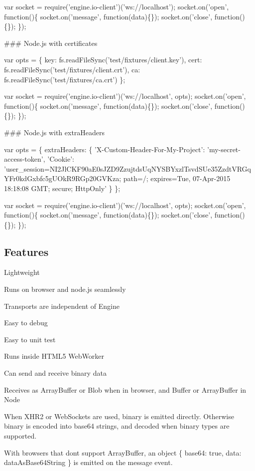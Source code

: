 \begin{DoxyCode}
var socket = require('engine.io-client')('ws://localhost');
socket.on('open', function()\{
  socket.on('message', function(data)\{\});
  socket.on('close', function()\{\});
\});
\end{DoxyCode}


\#\#\# Node.\+js with certificates 
\begin{DoxyCode}
var opts = \{
  key: fs.readFileSync('test/fixtures/client.key'),
  cert: fs.readFileSync('test/fixtures/client.crt'),
  ca: fs.readFileSync('test/fixtures/ca.crt')
\};

var socket = require('engine.io-client')('ws://localhost', opts);
socket.on('open', function()\{
  socket.on('message', function(data)\{\});
  socket.on('close', function()\{\});
\});
\end{DoxyCode}


\#\#\# Node.\+js with extra\+Headers 
\begin{DoxyCode}
var opts = \{
  extraHeaders: \{
    'X-Custom-Header-For-My-Project': 'my-secret-access-token',
    'Cookie':
       'user\_session=NI2JlCKF90aE0sJZD9ZzujtdsUqNYSBYxzlTsvdSUe35ZzdtVRGqYFr0kdGxbfc5gUOkR9RGp20GVKza; path=/; expires=Tue, 07-Apr-2015 18:18:08 GMT; secure; HttpOnly'
  \}
\};

var socket = require('engine.io-client')('ws://localhost', opts);
socket.on('open', function()\{
  socket.on('message', function(data)\{\});
  socket.on('close', function()\{\});
\});
\end{DoxyCode}


\subsection*{Features}


\begin{DoxyItemize}
\item Lightweight
\item Runs on browser and node.\+js seamlessly
\item Transports are independent of {\ttfamily Engine}
\begin{DoxyItemize}
\item Easy to debug
\item Easy to unit test
\end{DoxyItemize}
\item Runs inside H\+T\+M\+L5 Web\+Worker
\item Can send and receive binary data
\begin{DoxyItemize}
\item Receives as Array\+Buffer or Blob when in browser, and Buffer or Array\+Buffer in Node
\item When X\+H\+R2 or Web\+Sockets are used, binary is emitted directly. Otherwise binary is encoded into base64 strings, and decoded when binary types are supported.
\item With browsers that don\textquotesingle{}t support Array\+Buffer, an object \{ base64\+: true, data\+: data\+As\+Base64\+String \} is emitted on the {\ttfamily message} event.
\end{DoxyItemize}
\end{DoxyItemize}


